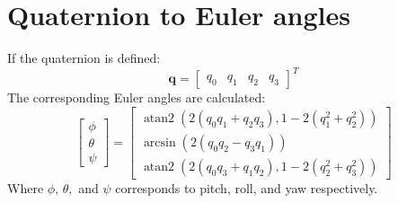 \chapter{Quaternion to Euler angles}
\label{app:eulerConversion}
If the quaternion is defined:
\[
\mathbf{q} = \left[ \begin{array}{cccc} q_0 & q_1 & q_2 & q_3 \end{array} \right ]^T
\]
The corresponding Euler angles are calculated:
\[
\left [ \begin{array}{c} \phi  \\ \theta  \\ \psi  \end{array} \right ] = \left [ \begin{array}{c} \operatorname{atan2}(2(q_0 q_1 + q_2 q_3), 1 - 2(q_{1}^2 + q_{2}^2)) \\ \arcsin(2(q_0 q_2 - q_3 q_1)) \\ \operatorname{atan2}(2(q_0 q_3 + q_1 q_2), 1- 2(q_2^2 + q_3^2))\end{array} \right ]
\]
Where  $\phi,\, \theta,$ and $ \psi$ corresponds to pitch, roll, and yaw respectively.

